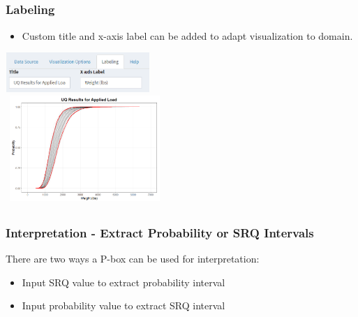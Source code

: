 \documentclass[handout, xcolor=dvipsnames]{beamer}
\begin{document}
\subsection{}
\begin{frame}
	\frametitle{Labeling}
	\begin{itemize}
	\item Custom title and x-axis label can be added to adapt visualization to domain. 
	\end{itemize}
	\begin{center} 
		\includegraphics[height=1.5cm,width=5.5cm]{figures/tab_lb.png} \\
		\includegraphics[height=4cm, width=6cm]{figures/plt_labeled.png}
	\end{center}
\end{frame}

\subsection{}
\begin{frame}
	\frametitle{Interpretation - Extract Probability or SRQ Intervals}
  There are two ways a P-box can be used for interpretation:
	\begin{itemize}
	  \item{Input SRQ value to extract probability interval}
	  \item{Input probability value to extract SRQ interval}
	\end{itemize}
\end{frame}
\end{document}
